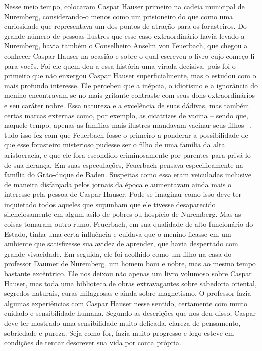 Nesse meio tempo, colocaram Caspar Hauser primeiro na cadeia municipal
de Nuremberg, considerando-o menos como um prisioneiro do que como uma
curiosidade que representava um dos pontos de atração para os
forasteiros. Do grande número de pessoas ilustres que esse caso
extraordinário havia levado a Nuremberg, havia também o Conselheiro
Anselm von Feuerbach, que chegou a conhecer Caspar Hauser na ocasião e
sobre o qual escreveu o livro cujo começo li para vocês. Foi ele quem
deu a essa história uma virada decisiva, pois foi o primeiro que não
enxergou Caspar Hauser superficialmente, mas o estudou com o mais
profundo interesse. Ele percebeu que a inépcia, o idiotismo e a
ignorância do menino encontravam-se no mais gritante contraste com seus
dons extraordinários e seu caráter nobre. Essa natureza e a excelência
de suas dádivas, mas também certas marcas externas como, por exemplo, as
cicatrizes de vacina -- sendo que, naquele tempo, apenas as famílias
mais ilustres mandavam vacinar seus filhos --, tudo isso fez com que
Feuerbach fosse o primeiro a ponderar a possibilidade de que esse
forasteiro misterioso pudesse ser o filho de uma família da alta
aristocracia, e que ele fora escondido criminosamente por parentes para
privá-lo de sua herança. Em suas especulações, Feuerbach pensava
especificamente na família do Grão-duque de Baden. Suspeitas como essa eram veiculadas inclusive de maneira disfarçada pelos jornais da época e aumentavam ainda mais o interesse pela pessoa de Caspar Hauser. Pode-se imaginar como isso deve ter inquietado todos aqueles que supunham que ele tivesse
desaparecido silenciosamente em algum asilo de pobres ou hospício de
Nuremberg. Mas as coisas tomaram outro rumo. Feuerbach, em sua qualidade
de alto funcionário do Estado, tinha uma certa influência e cuidava que
o menino ficasse em um ambiente que satisfizesse sua avidez de aprender,
que havia despertado com grande vivacidade. Em seguida, ele foi acolhido
como um filho na casa do professor Daumer de Nuremberg, um homem bom e
nobre, mas ao mesmo tempo bastante excêntrico. Ele nos deixou não apenas
um livro volumoso sobre Caspar Hauser, mas toda uma biblioteca de obras
extravagantes sobre sabedoria oriental, segredos naturais, curas
milagrosas e ainda sobre magnetismo. O professor fazia algumas
experiências com Caspar Hauser nesse sentido, certamente com muito
cuidado e sensibilidade humana. Segundo as descrições que nos deu disso,
Caspar deve ter mostrado uma sensibilidade muito delicada, clareza de
pensamento, sobriedade e pureza. Seja como for, fazia muito progresso e
logo esteve em condições de tentar descrever sua vida por conta própria.
